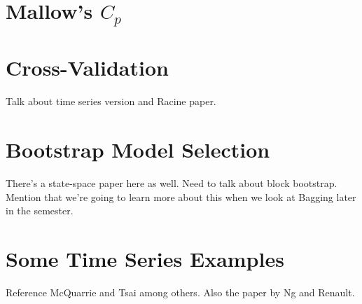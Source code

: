\documentclass[12pt]{article}
\theoremstyle{definition}
\begin{document}
\section{Mallow's $C_p$}

\section{Cross-Validation}
Talk about time series version and Racine paper.

\section{Bootstrap Model Selection}
There's a state-space paper here as well. Need to talk about block bootstrap. Mention that we're going to learn more about this when we look at Bagging later in the semester.


\section{Some Time Series Examples}
Reference McQuarrie and Tsai among others. Also the paper by Ng and Renault. 
\end{document}
